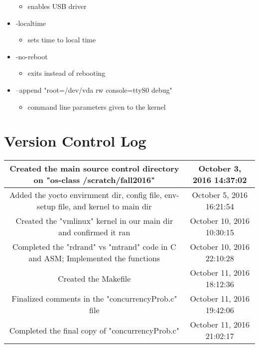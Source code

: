 \documentclass[letterpaper,10pt,onecolumn]{IEEEtran}
\begin{document}
\begin{itemize}
\begin{itemize}
            \item enables USB driver
        \end{itemize}
        \item -localtime
        \begin{itemize}
            \item sets time to local time
        \end{itemize}
        \item -no-reboot
        \begin{itemize}
            \item exits instead of rebooting
        \end{itemize}
        \item --append "root=/dev/vda rw console=ttyS0 debug"
        \begin{itemize}
            \item command line parameters given to the kernel
        \end{itemize}
    \end{itemize}
    
    \vspace{7mm}
    
    \section*{Version Control Log}
    \begin{tabular}{ |c|c| }
        \hline
    	Created the main source control directory on "os-class /scratch/fall2016" & October 3, 2016   14:37:02 \\
    	\hline
		Added the yocto envirnment dir, config file, env-setup file, and kernel to main dir & October 5, 2016   16:21:54 \\ 
		\hline
		Created the "vmlinux" kernel in our main dir and confirmed it ran & October 10, 2016  10:30:15 \\
		\hline
		Completed the "rdrand" vs "mtrand" code in C and ASM; Implemented the functions & October 10, 2016  22:10:28\\
		\hline
		Created the Makefile & October 11, 2016  18:12:36 \\
		\hline
		Finalized comments in the "concurrencyProb.c" file & October 11, 2016  19:42:06 \\
		\hline
		Completed the final copy of "concurrencyProb.c" & October 11, 2016  21:02:17 \\
		\hline
	\end{tabular}
    
\end{document}
